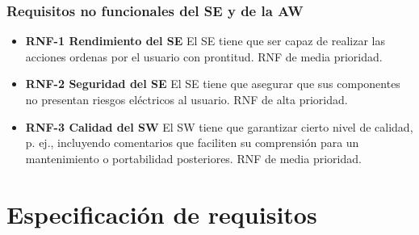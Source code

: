 \subsubsection{Requisitos no funcionales del SE y de la AW}
\label{sec:spec-nofuncionales}
\begin{itemize}
  \item \textbf{RNF-1 Rendimiento del SE} El SE tiene que ser capaz de realizar
  las acciones ordenas por el usuario con prontitud. RNF de media prioridad.
  \item \textbf{RNF-2 Seguridad del SE} El SE tiene que asegurar que sus
  componentes no presentan riesgos eléctricos al usuario. RNF de alta prioridad.
  \item \textbf{RNF-3 Calidad del SW} El SW tiene que garantizar cierto nivel
  de calidad, p. ej., incluyendo comentarios que faciliten su comprensión para
  un mantenimiento o portabilidad posteriores. RNF de media prioridad.
\end{itemize}

\section{Especificación de requisitos}
